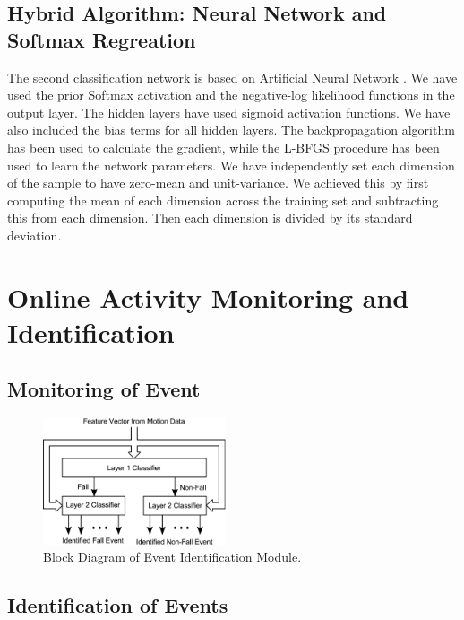 \documentclass{IEEEtran}
\begin{document}
\subsection{Hybrid Algorithm: Neural Network and Softmax Regreation}
\label{sec:HybridAlgorithmNeuralNetworkAndSoftmaxRegreation}

The second classification network is based on Artificial Neural Network \cite{Bishop06a}. 
We have used the prior Softmax activation  and the negative-log likelihood 
functions in the output layer. The hidden layers have used sigmoid activation functions. 
We have also included the bias terms for all hidden layers. The backpropagation algorithm 
has been used to calculate the gradient, while the L-BFGS procedure has been used to 
learn the network parameters. We have independently set each dimension of the sample to 
have zero-mean and unit-variance. We achieved this by first computing the mean of each 
dimension across the training set and subtracting this from each dimension. Then each 
dimension is divided by its standard deviation.       

\section{Online Activity Monitoring and Identification}



\subsection{Monitoring of Event}

\begin{figure}[htbp]
	\centering
		\includegraphics[width=0.48\textwidth]{figures/TrainedIdentificationModule.eps}
	\caption{Block Diagram of Event Identification Module.}
	\label{fig:TrainedIdentificationModule}
\end{figure}


\subsection{Identification of Events}
\end{document}
